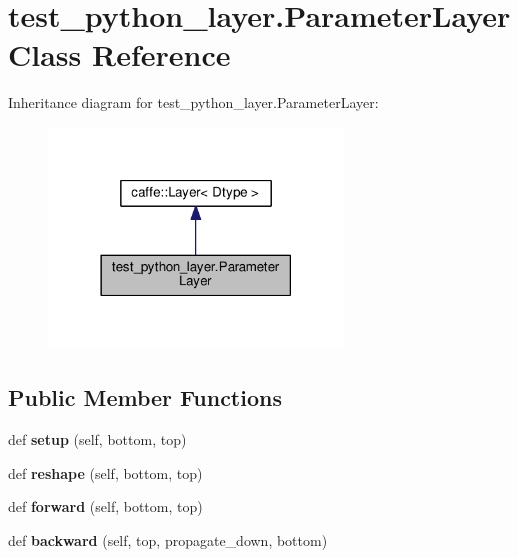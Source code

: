 \hypertarget{classtest__python__layer_1_1_parameter_layer}{}\section{test\+\_\+python\+\_\+layer.\+Parameter\+Layer Class Reference}
\label{classtest__python__layer_1_1_parameter_layer}


Inheritance diagram for test\+\_\+python\+\_\+layer.\+Parameter\+Layer\+:
\nopagebreak
\begin{figure}[H]
\begin{center}
\leavevmode
\includegraphics[width=222pt]{classtest__python__layer_1_1_parameter_layer__inherit__graph}
\end{center}
\end{figure}
\subsection*{Public Member Functions}
\begin{DoxyCompactItemize}
\item 
\mbox{\label{classtest__python__layer_1_1_parameter_layer_adb4100d37df0a5f06cbbbf553a9719ce}} 
def {\bfseries setup} (self, bottom, top)
\item 
\mbox{\label{classtest__python__layer_1_1_parameter_layer_a489bd7ecfdb3c14cc9da91865bb7ce7d}} 
def {\bfseries reshape} (self, bottom, top)
\item 
\mbox{\label{classtest__python__layer_1_1_parameter_layer_a3921340e53782b026b35ad17ed58ee92}} 
def {\bfseries forward} (self, bottom, top)
\item 
\mbox{\label{classtest__python__layer_1_1_parameter_layer_a63bdbb451fbabc029af351d443153f40}} 
def {\bfseries backward} (self, top, propagate\+\_\+down, bottom)
\end{DoxyCompactItemize}
